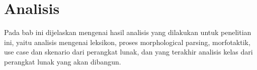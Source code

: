 \chapter{Analisis}
\label{chap:analisis}

Pada bab ini dijelaskan mengenai hasil analisis yang dilakukan untuk penelitian ini, yaitu analisis mengenai leksikon, proses morphological parsing, morfotaktik, use case dan skenario dari perangkat lunak, dan yang terakhir analisis kelas dari perangkat lunak yang akan dibangun.

%
%
%
%
%
%
